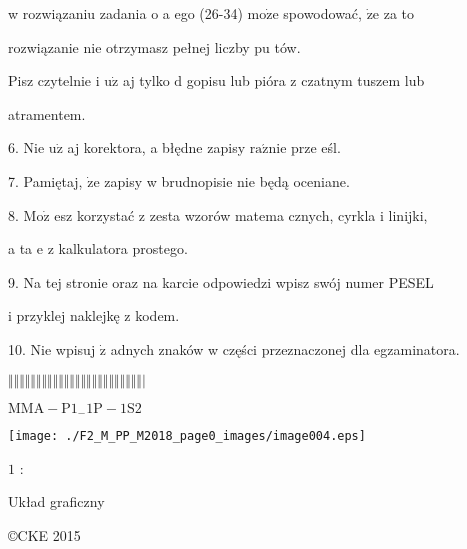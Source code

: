 \documentclass[a4paper,12pt]{article}
\begin{document}
w rozwiązaniu zadania o a ego (26-34) $\mathrm{m}\mathrm{o}\dot{\mathrm{z}}\mathrm{e}$ spowodować, $\dot{\mathrm{z}}\mathrm{e}$ za to

rozwiązanie nie otrzymasz pełnej liczby pu tów.

Pisz czytelnie i $\mathrm{u}\dot{\mathrm{z}}$ aj tylko $\mathrm{d}$ gopisu lub pióra z czatnym tuszem lub

atramentem.

6. Nie $\mathrm{u}\dot{\mathrm{z}}$ aj korektora, a błędne zapisy $\mathrm{r}\mathrm{a}\acute{\mathrm{z}}\mathrm{n}\mathrm{i}\mathrm{e}$ prze eśl.

7. Pamiętaj, $\dot{\mathrm{z}}\mathrm{e}$ zapisy w brudnopisie nie będą oceniane.

8. $\mathrm{M}\mathrm{o}\dot{\mathrm{z}}$ esz korzystać z zesta wzorów matema cznych, cyrkla i linijki,

a ta $\mathrm{e}$ z kalkulatora prostego.

9. Na tej stronie oraz na karcie odpowiedzi wpisz swój numer PESEL

i przyklej naklejkę z kodem.

10. Nie wpisuj $\dot{\mathrm{z}}$ adnych znaków w części przeznaczonej dla egzaminatora.

$\Vert\Vert\Vert\Vert\Vert\Vert\Vert\Vert\Vert\Vert\Vert\Vert\Vert\Vert\Vert\Vert\Vert\Vert\Vert\Vert\Vert\Vert\Vert\Vert|$

$\mathrm{M}\mathrm{M}\mathrm{A}-\mathrm{P}1_{-}1\mathrm{P}-1\mathrm{S}2$
\begin{center}
\texttt{[image: ./F2\_M\_PP\_M2018\_page0\_images/image004.eps]}
\end{center}
$1$ :

Układ graficzny

\copyright CKE 2015
\end{document}
